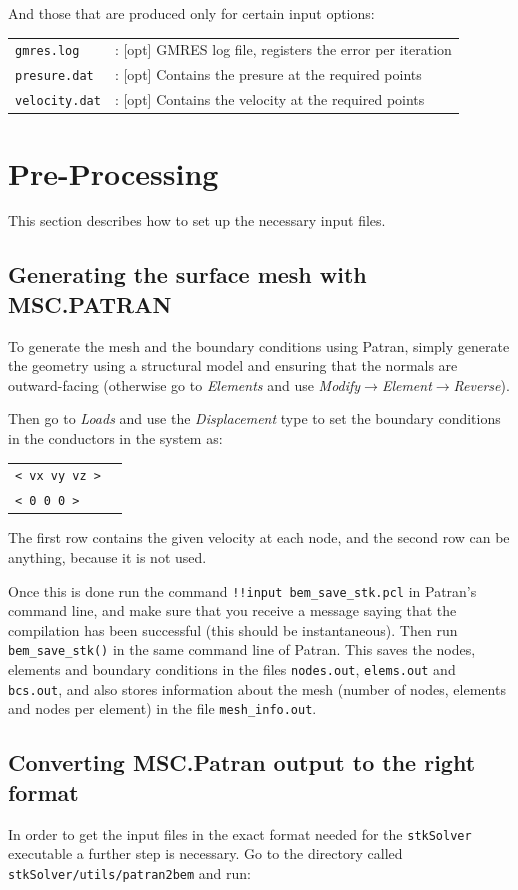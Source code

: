 \documentclass[12pt]{article}
\begin{document}
And those that are produced only for certain input options:

\begin{tabular}{ll}
\texttt{gmres.log}&: [opt] GMRES log file, registers the error per iteration\\
\texttt{presure.dat}&: [opt] Contains the presure at the required points\\
\texttt{velocity.dat}&: [opt] Contains the velocity at the required points
\end{tabular}

\section{Pre-Processing}
This section describes how to set up the necessary input files.

\subsection{Generating the surface mesh with MSC.PATRAN}
To generate the mesh and the boundary conditions using Patran, simply generate the geometry using a structural model and ensuring that the normals are outward-facing (otherwise go to {\it Elements} and use {\it Modify$\rightarrow$Element$\rightarrow$Reverse}).

Then go to {\it Loads} and use the {\it Displacement} type to set the boundary conditions in the conductors in the system as:

\begin{tabular}{ll}
\texttt{< vx vy vz >}\\
\texttt{< 0 0 0 >}
\end{tabular}

The first row contains the given velocity at each node, and the second row can be anything, because it is not used.

Once this is done run the command \verb+!!input bem_save_stk.pcl+ in Patran's command line, and make sure that you receive a message saying that the compilation has been successful (this should be instantaneous). Then run \verb+bem_save_stk()+ in the same command line of Patran. This saves the nodes, elements and boundary conditions in the files \verb+nodes.out+, \verb+elems.out+ and \verb+bcs.out+, and also stores information about the mesh (number of nodes, elements and nodes per element) in the file \verb+mesh_info.out+.

\subsection{Converting MSC.Patran output to the right format}
In order to get the input files in the exact format needed for the \verb+stkSolver+ executable a further step is necessary. Go to the directory called \verb+stkSolver/utils/patran2bem+ and run:
\end{document}
